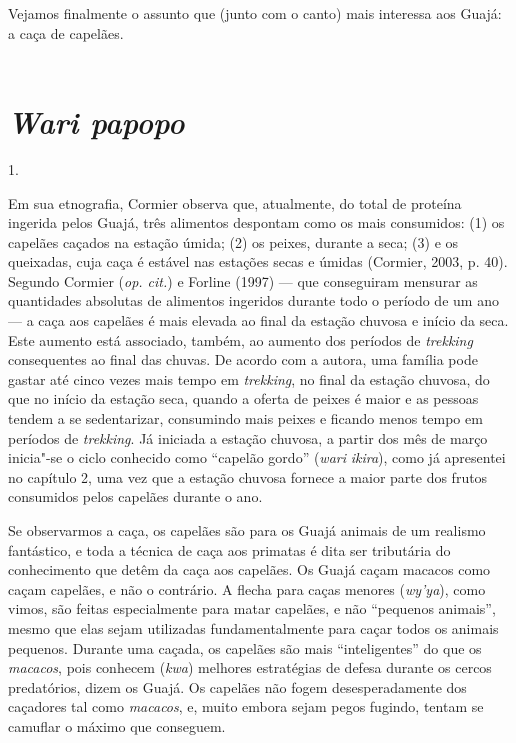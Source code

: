 Vejamos finalmente o assunto que (junto com o canto) mais interessa aos
Guajá: a caça de capelães.\\
\\

\section{\emph{Wari papopo}}\label{wari-papopo}

1.

Em sua etnografia, Cormier observa que, atualmente, do total de proteína
ingerida pelos Guajá, três alimentos despontam como os mais consumidos:
(1) os capelães caçados na estação úmida; (2) os peixes, durante a seca;
(3) e os queixadas, cuja caça é estável nas estações secas e úmidas
(Cormier, 2003, p. 40). Segundo Cormier (\emph{op. cit.}) e Forline (1997) --- que
conseguiram mensurar as quantidades absolutas de alimentos ingeridos
durante todo o período de um ano --- a caça aos capelães é mais elevada ao
final da estação chuvosa e início da seca. Este aumento está associado,
também, ao aumento dos períodos de \emph{trekking} consequentes ao final
das chuvas. De acordo com a autora, uma família pode gastar até cinco
vezes mais tempo em \emph{trekking}, no final da estação chuvosa, do que
no início da estação seca, quando a oferta de peixes é maior e as
pessoas tendem a se sedentarizar, consumindo mais peixes e ficando menos
tempo em períodos de \emph{trekking}. Já iniciada a estação chuvosa, a
partir dos mês de março inicia"-se o ciclo conhecido como ``capelão gordo''
(\emph{wari} \emph{ikira}), como já apresentei no capítulo 2, uma vez
que a estação chuvosa fornece a maior parte dos frutos consumidos pelos
capelães durante o ano.

Se observarmos a caça, os capelães são para os Guajá animais de um
realismo fantástico, e toda a técnica de caça aos primatas é dita ser
tributária do conhecimento que detêm da caça aos capelães. Os Guajá
caçam macacos como caçam capelães, e não o contrário. A flecha para
caças menores (\emph{wy'ya}), como vimos, são feitas especialmente para
matar capelães, e não ``pequenos animais'', mesmo que elas sejam
utilizadas fundamentalmente para caçar todos os animais pequenos.
Durante uma caçada, os capelães são mais ``inteligentes'' do que os
\emph{macacos}, pois conhecem (\emph{kwa}) melhores estratégias de
defesa durante os cercos predatórios, dizem os Guajá. Os capelães não
fogem desesperadamente dos caçadores tal como \emph{macacos}, e, muito
embora sejam pegos fugindo, tentam se camuflar o máximo que conseguem.


